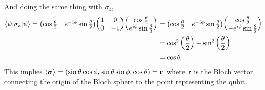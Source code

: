 And doing the same thing with $\sigma_z$,
\begin{align*}
    \braket{\psi|\sigma_z|\psi} = \mqty(\cos\frac{\theta}{2}& e^{-i\phi}\sin\frac{\theta}{2}) \mqty(1 & 0 \\ 0 & -1)\mqty(\cos\frac{\theta}{2}\\ e^{i\phi}\sin\frac{\theta}{2}) &= \mqty(\cos\frac{\theta}{2}& e^{-i\phi}\sin\frac{\theta}{2}) \mqty(\cos \frac{\theta}{2}\\ -e^{i\phi}\sin\frac{\theta}{2})\\ &=\cos^2\qty(\frac{\theta}{2})-\sin^2\qty(\frac{\theta}{2})\\
    &=\cos \theta
\end{align*}
This implies $\left\langle \boldsymbol{\sigma} \right\rangle = (\sin\theta\cos\phi, \sin\theta\sin\phi, \cos\theta)= \vb{r}$ where $\vb{r}$ is the Bloch vector, connecting the origin of the Bloch sphere to the point representing the qubit.